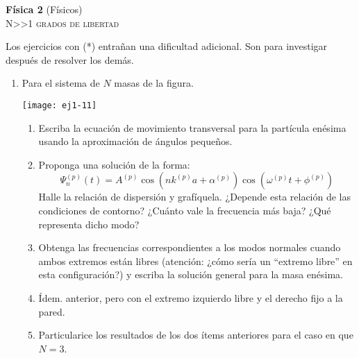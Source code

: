 \documentclass[11pt,spanish,a4paper]{article}
\begin{document}
\begin{center}
\textbf{Física 2} (Físicos) \hfill {}\\
	\textsc{\LARGE N\textgreater\textgreater1 grados de libertad}
\end{center}

Los ejercicios con (*) entrañan una dificultad adicional. Son para investigar después de resolver los demás.


\begin{enumerate}




\item
\begin{minipage}[t][1cm]{0.45\textwidth}
Para el sistema de $N$ masas de la figura. 
\end{minipage}
\begin{minipage}[c][1.5cm][t]{0.5\textwidth}
  \texttt{[image: ej1-11]}
\end{minipage}
\begin{enumerate}
	\item Escriba la ecuación de movimiento transversal para la partícula enésima usando la aproximación de ángulos pequeños.
	\item Proponga una solución de la forma:
	\[
		\Psi_{n}^{(p)}(t)=A^{(p)}\cos\left(nk^{(p)}a+\alpha^{(p)}\right)\cos\left(\omega^{(p)}t+\phi^{(p)}\right)
	\]
	Halle la relación de dispersión y grafíquela.
	¿Depende esta relación de las condiciones de contorno?
	¿Cuánto vale la frecuencia más baja?
	¿Qué representa dicho modo? 
	\item Obtenga las frecuencias correspondientes a los modos normales cuando ambos extremos están libres (atención: ¿cómo sería un ``extremo libre'' en esta configuración?) y escriba la solución general para la masa enésima. 
	\item Ídem. anterior, pero con el extremo izquierdo libre y el derecho fijo a la pared. 
	\item Particularice los resultados de los dos ítems anteriores para el caso en que $N=3$.
\end{enumerate}




\end{enumerate}
\end{document}
